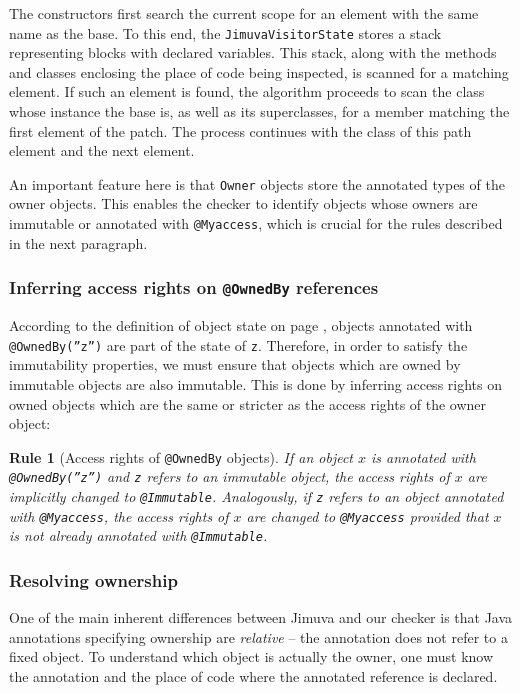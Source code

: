 \documentclass{pracamgr}
\theoremstyle{break}
\theoremstyle{break}
\theoremstyle{break}
\newtheorem{verrule}{Rule}
\begin{document}
The constructors first search the current scope for an element with
the same name as the base. To this end, the
\texttt{JimuvaVisitorState} stores a stack representing blocks with
declared variables. This stack, along with the methods and classes
enclosing the place of code being inspected, is scanned for a
matching element. If such an element is found, the algorithm proceeds
to scan the class whose instance the base is, as well as its
superclasses, for a member matching the first element of the
patch. The process continues with the class of this path element and
the next element.

An important feature here is that \texttt{Owner} objects store the
annotated types of the owner objects. This enables the checker to
identify objects whose owners are immutable or annotated with
\texttt{@Myaccess}, which is crucial for the rules described in the
next paragraph.

\subsubsection{Inferring access rights on \texttt{@OwnedBy} references} 

According to the definition of object state on page
\pageref{def:state}, objects annotated with \texttt{@OwnedBy(''z'')}
are part of the state of \texttt{z}. Therefore, in order to satisfy
the immutability properties, we must ensure that objects which are
owned by immutable objects are also immutable. This is done by
inferring access rights on owned objects which are the same or
stricter as the access rights of the owner object:

\begin{verrule}[Access rights of \texttt{@OwnedBy} objects]
  If an object $x$ is annotated with \texttt{@OwnedBy(''z'')} and
  \texttt{z} refers to an immutable object, the access rights of $x$
  are implicitly changed to \texttt{@Immutable}. Analogously, if
  \texttt{z} refers to an object annotated with \texttt{@Myaccess},
  the access rights of $x$ are changed to \texttt{@Myaccess} provided
  that $x$ is not already annotated with \texttt{@Immutable}.
\end{verrule}
\vspace{-0.7cm}

\subsubsection{Resolving ownership} 

One of the main inherent differences between Jimuva and our checker is
that Java annotations specifying ownership are \emph{relative} -- the
annotation does not refer to a fixed object. To understand which
object is actually the owner, one must know the annotation and the
place of code where the annotated reference is declared.
\end{document}
